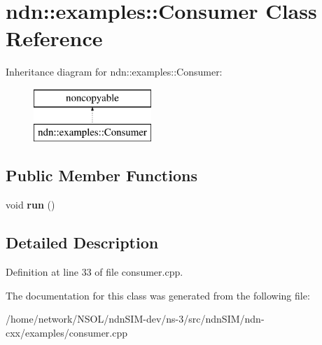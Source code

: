 \hypertarget{classndn_1_1examples_1_1Consumer}{}\section{ndn\+:\+:examples\+:\+:Consumer Class Reference}
\label{classndn_1_1examples_1_1Consumer}
Inheritance diagram for ndn\+:\+:examples\+:\+:Consumer\+:\begin{figure}[H]
\begin{center}
\leavevmode
\includegraphics[height=2.000000cm]{classndn_1_1examples_1_1Consumer}
\end{center}
\end{figure}
\subsection*{Public Member Functions}
\begin{DoxyCompactItemize}
\item 
void {\bfseries run} ()\hypertarget{classndn_1_1examples_1_1Consumer_a033dbb63bb67cd2bf5104b0edb0b70b5}{}\label{classndn_1_1examples_1_1Consumer_a033dbb63bb67cd2bf5104b0edb0b70b5}

\end{DoxyCompactItemize}


\subsection{Detailed Description}


Definition at line 33 of file consumer.\+cpp.



The documentation for this class was generated from the following file\+:\begin{DoxyCompactItemize}
\item 
/home/network/\+N\+S\+O\+L/ndn\+S\+I\+M-\/dev/ns-\/3/src/ndn\+S\+I\+M/ndn-\/cxx/examples/consumer.\+cpp\end{DoxyCompactItemize}
